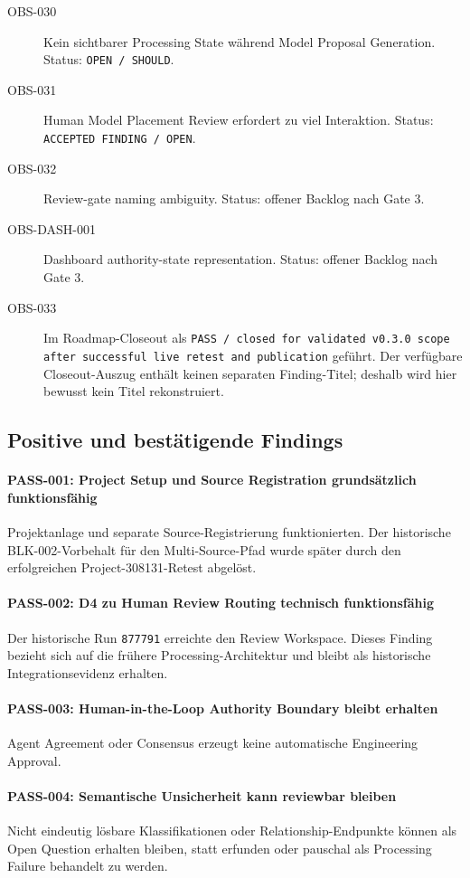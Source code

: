 \begin{description}
    \item[OBS-030] Kein sichtbarer Processing State während Model Proposal Generation. Status: \texttt{OPEN / SHOULD}.
    \item[OBS-031] Human Model Placement Review erfordert zu viel Interaktion. Status: \texttt{ACCEPTED FINDING / OPEN}.
    \item[OBS-032] Review-gate naming ambiguity. Status: offener Backlog nach Gate 3.
    \item[OBS-DASH-001] Dashboard authority-state representation. Status: offener Backlog nach Gate 3.
    \item[OBS-033] Im Roadmap-Closeout als \texttt{PASS / closed for validated v0.3.0 scope after successful live retest and publication} geführt. Der verfügbare Closeout-Auszug enthält keinen separaten Finding-Titel; deshalb wird hier bewusst kein Titel rekonstruiert.
\end{description}

\subsection{Positive und bestätigende Findings}

\paragraph{PASS-001: Project Setup und Source Registration grundsätzlich funktionsfähig}
Projektanlage und separate Source-Registrierung funktionierten. Der historische
BLK-002-Vorbehalt für den Multi-Source-Pfad wurde später durch den erfolgreichen
Project-308131-Retest abgelöst.

\paragraph{PASS-002: D4 zu Human Review Routing technisch funktionsfähig}
Der historische Run \texttt{877791} erreichte den Review Workspace. Dieses Finding
bezieht sich auf die frühere Processing-Architektur und bleibt als historische
Integrationsevidenz erhalten.

\paragraph{PASS-003: Human-in-the-Loop Authority Boundary bleibt erhalten}
Agent Agreement oder Consensus erzeugt keine automatische Engineering Approval.

\paragraph{PASS-004: Semantische Unsicherheit kann reviewbar bleiben}
Nicht eindeutig lösbare Klassifikationen oder Relationship-Endpunkte können als
Open Question erhalten bleiben, statt erfunden oder pauschal als Processing Failure
behandelt zu werden.

